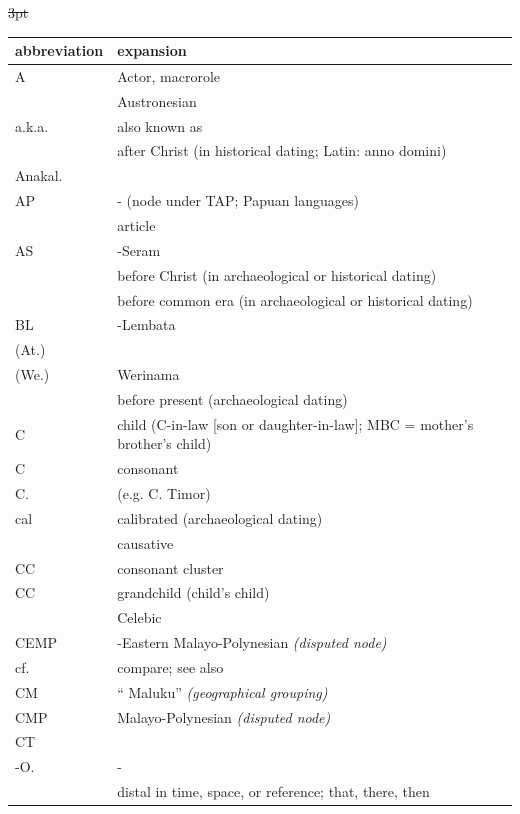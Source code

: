 {\wg\st{3pt}
\begin{xltabular}{\textwidth}[l]{l>{\raggedright\arraybackslash}X}
\lsptoprule			
{abbreviation}	&	{expansion}	\\	\midrule
\endhead
A	&	Actor, macrorole	\\
 & Austronesian \\
a.k.a.	&	also known as	\\
	&	after Christ (in historical dating; Latin: anno domini)	\\
Anakal.	&		\\
AP	&	- (node under TAP; Papuan languages)	\\
	&	article	\\
AS	&	-Seram	\\
	&	before Christ (in archaeological or historical dating)	\\
	&	before common era (in archaeological or historical dating)	\\
BL	&	-Lembata	\\
 (At.)	&	 	\\
 (We.)	&	Werinama 	\\
	&	before present (archaeological dating)	\\
C	&	child (C-in-law [son or daughter-in-law]; MBC = mother’s brother’s child)	\\
C	&	consonant	\\
C.	&	 (e.g. C. Timor)	\\
cal	&	calibrated (archaeological dating)	\\
	&	causative	\\
CC	&	consonant cluster	\\
CC	&	grandchild (child's child)	\\
	&	Celebic	\\
CEMP	&	-Eastern Malayo-Polynesian \it{(disputed node)}	\\
cf.	&	compare; see also	\\
CM	&	“ Maluku” \it{(geographical grouping)}	\\
CMP	&	 Malayo-Polynesian \it{(disputed node)}	\\
CT	&		\\
-O.	&	-	\\
	&	distal in time, space, or reference; that, there, then	\\

\end{xltabular}}
